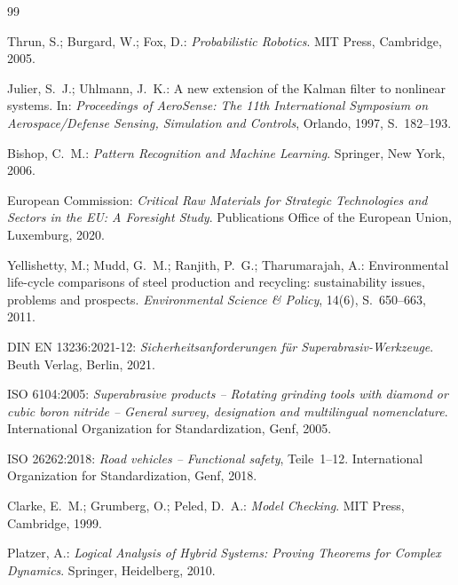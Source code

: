 ﻿\documentclass[a4paper,12pt]{article}
\theoremstyle{definition}
\begin{document}
\begin{thebibliography}{99}
 
Thrun, S.; Burgard, W.; Fox, D.:
\textit{Probabilistic Robotics}.
MIT Press, Cambridge, 2005.
 
Julier, S.~J.; Uhlmann, J.~K.:
A new extension of the Kalman filter to nonlinear systems.
In: \textit{Proceedings of AeroSense: The 11th International Symposium on
Aerospace/Defense Sensing, Simulation and Controls}, Orlando, 1997, S.~182--193.
 
Bishop, C.~M.:
\textit{Pattern Recognition and Machine Learning}.
Springer, New York, 2006.
 
 
European Commission:
\textit{Critical Raw Materials for Strategic Technologies and Sectors in the EU:
A Foresight Study}.
Publications Office of the European Union, Luxemburg, 2020.
 
Yellishetty, M.; Mudd, G.~M.; Ranjith, P.~G.; Tharumarajah, A.:
Environmental life-cycle comparisons of steel production and recycling:
sustainability issues, problems and prospects.
\textit{Environmental Science \& Policy}, 14(6), S.~650--663, 2011.
 
 
DIN EN 13236:2021-12:
\textit{Sicherheitsanforderungen f{\"u}r Superabrasiv-Werkzeuge}.
Beuth Verlag, Berlin, 2021.
 
ISO 6104:2005:
\textit{Superabrasive products -- Rotating grinding tools with diamond or
cubic boron nitride -- General survey, designation and multilingual nomenclature}.
International Organization for Standardization, Genf, 2005.
 
ISO 26262:2018:
\textit{Road vehicles -- Functional safety}, Teile~1--12.
International Organization for Standardization, Genf, 2018.
 
 
Clarke, E.~M.; Grumberg, O.; Peled, D.~A.:
\textit{Model Checking}.
MIT Press, Cambridge, 1999.
 
Platzer, A.:
\textit{Logical Analysis of Hybrid Systems: Proving Theorems for Complex Dynamics}.
Springer, Heidelberg, 2010.
 
\end{thebibliography}
\end{document}
